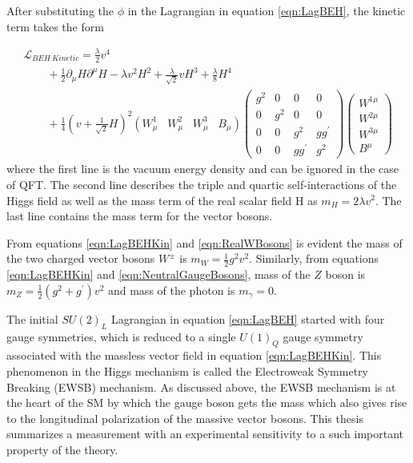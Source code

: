 After substituting the $\phi$ in the Lagrangian in equation \ref{eqn:LagBEH}, the kinetic term takes the form

\begin{equation}
\begin{array}{l}
\mathcal{L}_{BEH~Kinetic}  = \frac{\lambda}{2}v^{4} \\
\hspace{25pt}  +\frac{1}{2} \partial_{\mu}H \partial^{\mu}H - \lambda v^{2}H^{2} + \frac{\lambda}{\sqrt{2}} v H^{3} + \frac{\lambda}{8} H^4  \\
\hspace{25pt} + \frac{1}{4} ( v +\frac{1}{\sqrt{2} } H)^2 (W_{\mu}^{1} \hspace{10pt} W_{\mu}^2 \hspace{10pt} W_{\mu}^3 \hspace{10pt} B_{\mu} ) \begin{pmatrix} g^2 & 0 & 0 & 0 \\ 0 & g^2 & 0 & 0 \\  0  & 0 & g^2 & gg^{'} \\ 0  & 0 & gg^{'} & g^{2} \end{pmatrix} \begin{pmatrix} W^{1\mu}\\ W^{2\mu} \\ W^{3\mu} \\ B^{\mu} \end{pmatrix}
\end{array}
\label{eqn:LagBEHKin}
\end{equation}
where the first line is the vacuum energy density and can be ignored in the case of QFT. The second line describes the triple and quartic self-interactions of the Higgs field as well as the mass term of the real scalar field H as $m_{H} = 2\lambda v^2$. The last line contains the mass term for the vector bosons. 

From equations \ref{eqn:LagBEHKin} and \ref{eqn:RealWBosons} is evident the mass of the two charged vector bosons $W^{\pm}$ is $m_{W}=\frac{1}{2}g^2v^2$. Similarly, from equations \ref{eqn:LagBEHKin} and 
\ref{eqn:NeutralGaugeBosons}, mass of the $Z$ boson is $m_{Z} = \frac{1}{2}(g^2+g^{'})v^2$ and mass of the photon is $m_{\gamma}=0$. 

The initial $SU(2)_{L}$ Lagrangian in equation \ref{eqn:LagBEH} started with four gauge symmetries, which is reduced to a single $U(1)_{Q}$ gauge symmetry associated with the massless vector field in equation \ref{eqn:LagBEHKin}. This phenomenon in the Higgs mechanism is called the Electroweak Symmetry Breaking (EWSB) mechanism. As discussed above, the EWSB mechanism is at the heart of the SM by which the gauge boson gets the mass which also gives rise to the longitudinal polarization of the massive vector bosons. This thesis summarizes a measurement with an experimental sensitivity to a such important property of the theory.

